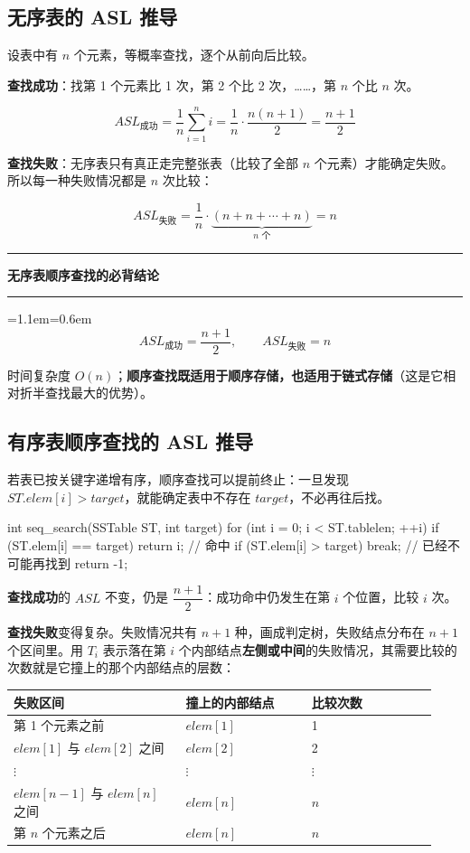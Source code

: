 \documentclass[11pt,openany,UTF8]{ctexbook}
\newcommand{\callouthead}[2]{%
  \par\addvspace{7pt}\noindent
  {\color{#1}\rule[-0.15em]{3pt}{1.05em}}\hspace{0.5em}%
  {\bfseries\color{#1}#2}\par\nobreak\vspace{-0.35em}%
  {\color{rulesep}\hrule height 0.4pt}\nobreak\vspace{0.45em}%
  \begingroup\small\setlength{\parindent}{0pt}%
  \leftskip=1.1em\rightskip=0.6em\noindent\ignorespaces}
\newcommand{\calloutend}{\par\endgroup\addvspace{7pt}}
\newenvironment{callkey}[1]{\callouthead{keybar}{#1}}{\calloutend}
\begin{document}
\subsection{无序表的 ASL 推导}

设表中有 $n$ 个元素，等概率查找，逐个从前向后比较。

\textbf{查找成功}：找第 1 个元素比 1 次，第 2 个比 2 次，……，第 $n$ 个比 $n$ 次。

\[ASL_{成功}=\frac{1}{n}\sum_{i=1}^{n}i=\frac{1}{n}\cdot\frac{n(n+1)}{2}=\frac{n+1}{2}\]

\textbf{查找失败}：无序表只有真正走完整张表（比较了全部 $n$ 个元素）才能确定失败。所以每一种失败情况都是 $n$ 次比较：

\[ASL_{失败}=\frac{1}{n}\cdot\underbrace{(n+n+\cdots+n)}_{n\text{ 个}}=n\]

\begin{callkey}{无序表顺序查找的必背结论}
\[ASL_{成功}=\frac{n+1}{2},\qquad ASL_{失败}=n\]

时间复杂度 $O(n)$；\textbf{顺序查找既适用于顺序存储，也适用于链式存储}（这是它相对折半查找最大的优势）。

\end{callkey}

\subsection{有序表顺序查找的 ASL 推导}

若表已按关键字递增有序，顺序查找可以提前终止：一旦发现 $ST.elem[i]>target$，就能确定表中不存在 $target$，不必再往后找。

\begin{codebox}
int seq_search(SSTable ST, int target) {
    for (int i = 0; i < ST.tablelen; ++i) {
        if (ST.elem[i] == target) return i;   // 命中
        if (ST.elem[i] > target)  break;      // 已经不可能再找到
    }
    return -1;
}
\end{codebox}

\textbf{查找成功}的 $ASL$ 不变，仍是 $\dfrac{n+1}{2}$：成功命中仍发生在第 $i$ 个位置，比较 $i$ 次。

\textbf{查找失败}变得复杂。失败情况共有 $n+1$ 种，画成判定树，失败结点分布在 $n+1$ 个区间里。用 $T_i$ 表示落在第 $i$ 个内部结点\textbf{左侧或中间}的失败情况，其需要比较的次数就是它撞上的那个内部结点的层数：

\begingroup\small\setlength{\tabcolsep}{4.0pt}
\begin{longtable}{@{}L{0.3783\linewidth}L{0.2751\linewidth}L{0.2751\linewidth}@{}}
\toprule
\textbf{失败区间} & \textbf{撞上的内部结点} & \textbf{比较次数} \\
\midrule
\endhead
第 1 个元素之前 & $elem[1]$ & 1 \\
$elem[1]$ 与 $elem[2]$ 之间 & $elem[2]$ & 2 \\
$\vdots$ & $\vdots$ & $\vdots$ \\
$elem[n-1]$ 与 $elem[n]$ 之间 & $elem[n]$ & $n$ \\
第 $n$ 个元素之后 & $elem[n]$ & $n$ \\
\bottomrule
\end{longtable}
\endgroup
\end{document}
